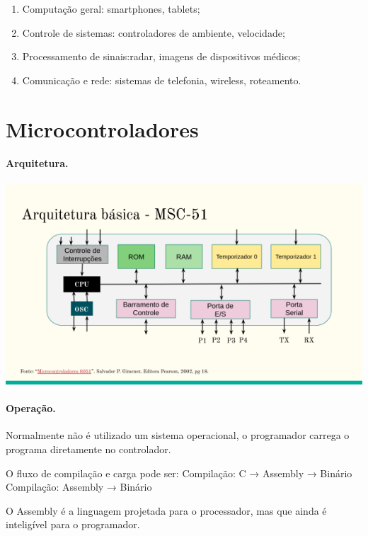 \begin{enumerate}

	\item Computação geral: smartphones, tablets;
	\item Controle de sistemas: controladores de ambiente, velocidade;
	\item Processamento de sinais:radar, imagens de dispositivos médicos;
	\item Comunicação e rede: sistemas de telefonia, wireless, roteamento.
\end{enumerate}

\section*{Microcontroladores}

\paragraph{Arquitetura.}

\begin{center}
\includegraphics[scale=.7]{img/msc51_arch.png}
\end{center}

\paragraph{Operação.} Normalmente não é utilizado um sistema operacional, 
o programador carrega o programa diretamente no controlador.

O fluxo de compilação e carga pode ser:
Compilação: C → Assembly → Binário
Compilação: Assembly → Binário

O Assembly é a linguagem projetada para o processador, 
mas que ainda é inteligível para o programador.

